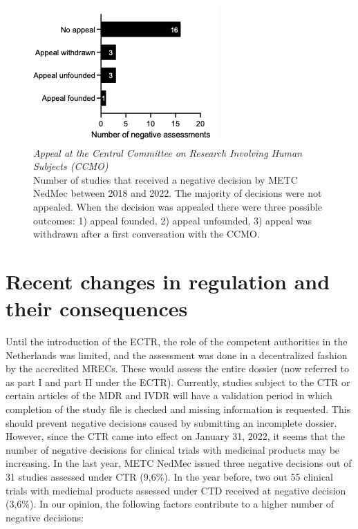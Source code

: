 \documentclass[authordate, meta, issue]{jote-new-article}
\begin{document}
\begin{figure}
  \begin{fullwidth}

    \includegraphics[width=\linewidth]{media/Picture4.png}

    \caption{\emph{Appeal at the Central Committee on Research Involving Human Subjects (CCMO)}\\
      Number of studies that received a negative decision by METC NedMec between 2018 and 2022. The majority of decisions were not appealed. When the decision was appealed there were three possible outcomes: 1) appeal founded, 2) appeal unfounded, 3) appeal was withdrawn after a first conversation with the CCMO.}

    \label{fig:rId14}
  \end{fullwidth}
\end{figure}







\section{Recent changes in regulation and their consequences}



Until the introduction of the ECTR, the role of the competent authorities in the Netherlands was limited, and the assessment was done in a decentralized fashion by the accredited MRECs. These would assess the entire dossier (now referred to as part I and part II under the ECTR). Currently, studies subject to the CTR or certain articles of the MDR and IVDR will have a validation period in which completion of the study file is checked and missing information is requested. This should prevent negative decisions caused by submitting an incomplete dossier. However, since the CTR came into effect on January 31, 2022, it seems that the number of negative decisions for clinical trials with medicinal products may be increasing. In the last year, METC NedMec issued three negative decisions out of 31 studies assessed under CTR (9,6\%). In the year before, two out 55 clinical trials with medicinal products assessed under CTD received at negative decision (3,6\%). In our opinion, the following factors contribute to a higher number of negative decisions:
\end{document}
